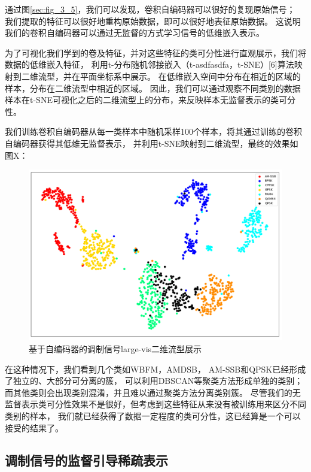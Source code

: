 通过图\ref{sec:fig_3_5}，我们可以发现，卷积自编码器可以很好的复现原始信号；
我们提取的特征可以很好地重构原始数据，即可以很好地表征原始数据。
这说明我们的卷积自编码器可以通过无监督的方式学习信号的低维嵌入表示。\par

为了可视化我们学到的卷及特征，并对这些特征的类可分性进行直观展示，我们将数据的低维嵌入特征，
利用t-分布随机邻接嵌入（t-asdfasdfa，t-SNE）[6]算法映射到二维流型，并在平面坐标系中展示。
在低维嵌入空间中分布在相近的区域的样本，分布在二维流型中相近的区域。
因此，我们可以通过观察不同类别的数据样本在t-SNE可视化之后的二维流型上的分布，来反映样本无监督表示的类可分性。\par

我们训练卷积自编码器从每一类样本中随机采样100个样本，将其通过训练的卷积自编码器获得其低维无监督表示，
并利用t-SNE映射到二维流型，最终的效果如图X：

\begin{figure}[!h]
	\centering
	\includegraphics[scale=0.4]{figures/chapter_3/fig_3_6}
	\caption{基于自编码器的调制信号large-vis二维流型展示}	\label{sec:fig_3_6}
\end{figure}

在这种情况下，我们看到几个类如WBFM，AMDSB， AM-SSB和QPSK已经形成了独立的、大部分可分离的簇，
可以利用DBSCAN等聚类方法形成单独的类别；而其他类则会出现类别混淆，并且难以通过聚类方法分离类别簇。 
尽管我们的无监督表示类可分性效果不是很好，但考虑到这些特征从来没有被训练用来区分不同类别的样本，
我们就已经获得了数据一定程度的类可分性，这已经算是一个可以接受的结果了。 \par 

\subsection{调制信号的监督引导稀疏表示}

